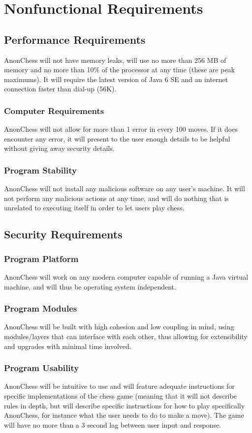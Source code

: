 \section{Nonfunctional Requirements}
\subsection{Performance Requirements}
AnonChess will not have memory leaks, will use no more than 256 MB of memory and no more than 10\% of the processor 
at any time (these are peak maximums). It will require the latest version of Java 6 SE and an internet connection faster 
than dial-up (56K).
\subsubsection{Computer Requirements}
AnonChess will not allow for more than 1 error in every 100 moves. If it does encounter any error, it will present 
to the user enough details to be helpful without giving away security details.
\subsubsection{Program Stability}
AnonChess will not install any malicious software on any user's machine. It will not perform any malicious actions 
at any time, and will do nothing that is unrelated to executing itself in order to let users play chess.
\subsection{Security Requirements}
\subsubsection{Program Platform}
AnonChess will work on any modern computer capable of running a Java virtual machine, and will thus be operating 
system independent.
\subsubsection{Program Modules}
AnonChess will be built with high cohesion and low coupling in mind, using modules/layers that can interface with 
each other, thus allowing for extensibility and upgrades with minimal time involved.
\subsubsection{Program Usability}
AnonChess will be intuitive to use and will feature adequate instructions for specific implementations of the chess 
game (meaning that it will not describe rules in depth, but will describe specific instructions for how to play 
specifically AnonChess, for instance what the user needs to do to make a move). The game will have no more than a 3 
second lag between user input and response.
